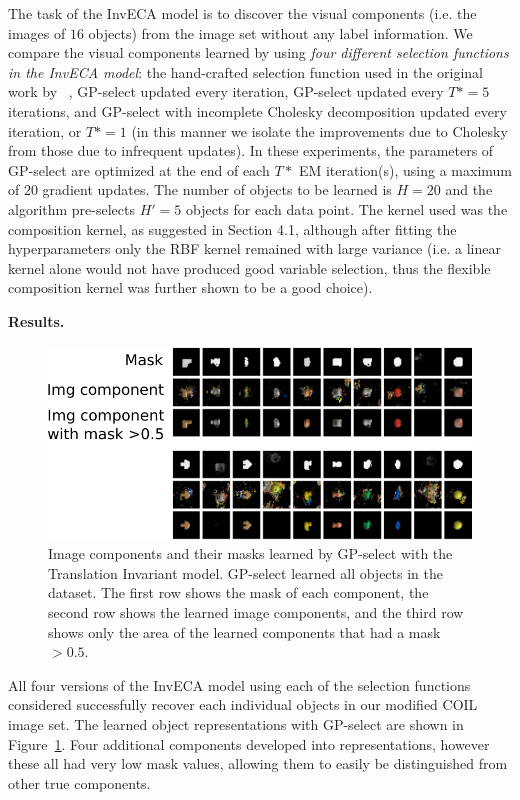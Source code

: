 The task of the InvECA model is to discover the visual components (i.e. the images of $16$ objects) from the image set without any label information. 
We compare the visual components learned by using \emph{four different selection functions in the InvECA model}: the hand-crafted selection function used in the original work by ~\citet{DaiLucke2012b}, GP-select updated every iteration, GP-select updated every $T*=5$ iterations, and GP-select with incomplete Cholesky decomposition updated every iteration, or $T\ast=1$ (in this manner we isolate the improvements due to Cholesky from those due to infrequent updates). 
In these experiments, the parameters of GP-select are optimized at the end of each $T*$ EM iteration(s), using a maximum of $20$ gradient updates.
The number of objects to be learned is $H=20$ and the algorithm pre-selects $H'=5$ objects for each data point.
The kernel used was the composition kernel, as suggested in Section 4.1, although after fitting the hyperparameters only the RBF kernel remained with large variance (i.e. a linear kernel alone would not have produced good variable selection, thus the flexible composition kernel was further shown to be a good choice).

\textbf{Results.}
%
\begin{figure}[t!]%
\centering
\includegraphics[width=\textwidth]{inveca/params_j_2blocks.pdf}%
\caption{Image components and their masks learned by GP-select with the Translation Invariant model. GP-select learned all objects in the dataset.
The first row shows the mask of each component, %
the second row shows the learned image components, %
and the third row shows only the area of the learned components that had a mask $>0.5$.
}
\label{fig:inveca-params}
\end{figure}
%
All four versions of the InvECA model using each of the selection functions considered successfully recover each individual objects in our modified COIL image set. 
The learned object representations with GP-select are shown in Figure~\ref{fig:inveca-params}. %
Four additional components developed into representations, however these all had very low mask values, allowing them to easily be distinguished from other true components.

